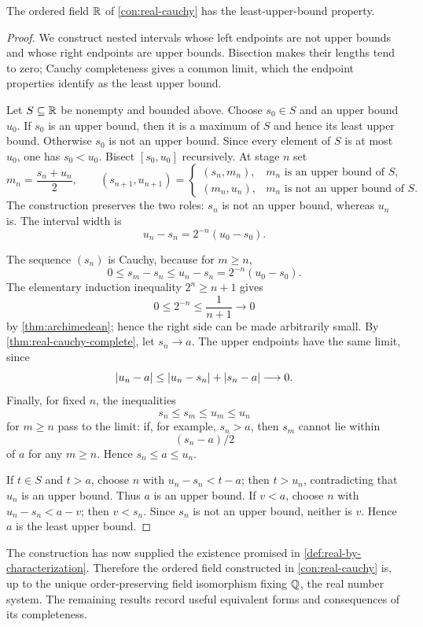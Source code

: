 \begin{theorem}
\label{thm:real-lub}
The ordered field $\mathbb{R}$ of \cref{con:real-cauchy} has the least-upper-bound property.
\end{theorem}

\begin{proof}
We construct nested intervals whose left endpoints are not upper bounds
and whose right endpoints are upper bounds. Bisection makes their lengths
tend to zero; Cauchy completeness gives a common limit, which the endpoint
properties identify as the least upper bound.

Let $S\subseteq\mathbb{R}$ be nonempty and bounded above. Choose $s_0\in S$ and an upper bound $u_0$. If $s_0$ is an upper bound, then it is a maximum of $S$ and hence its least upper bound. Otherwise $s_0$ is not an upper bound. Since every element of $S$ is at most $u_0$, one has $s_0<u_0$. Bisect $[s_0,u_0]$ recursively. At stage $n$ set
\[
m_n=\frac{s_n+u_n}{2},\qquad
(s_{n+1},u_{n+1})=
\begin{cases}
(s_n,m_n),&m_n\text{ is an upper bound of }S,\\
(m_n,u_n),&m_n\text{ is not an upper bound of }S.
\end{cases}
\]
The construction preserves the two roles: $s_n$ is not an upper bound,
whereas $u_n$ is. The interval width is
\[
 u_n-s_n=2^{-n}(u_0-s_0).
\]

The sequence $(s_n)$ is Cauchy, because for $m\geq n$,
\[
0\leq s_m-s_n\leq u_n-s_n=2^{-n}(u_0-s_0).
\]
The elementary induction inequality $2^n\geq n+1$ gives
\[
0\leq 2^{-n}\leq\frac{1}{n+1}\longrightarrow0
\]
by \cref{thm:archimedean}; hence the right side can be made arbitrarily small.
By \cref{thm:real-cauchy-complete}, let $s_n\to a$. The upper endpoints
have the same limit, since
\[
\lvert u_n-a\rvert\leq\lvert u_n-s_n\rvert+\lvert s_n-a\rvert\longrightarrow0.
\]
Finally, for fixed $n$, the inequalities
\[
s_n\leq s_m\leq u_m\leq u_n
\]
 for $m\geq n$ pass to the limit: if, for example, $s_n>a$, then $s_m$ cannot lie within
\[
(s_n-a)/2
\]
 of $a$ for any $m\geq n$. Hence $s_n\leq a\leq u_n$.

If $t\in S$ and $t>a$, choose $n$ with $u_n-s_n<t-a$; then $t>u_n$, contradicting that $u_n$ is an upper bound. Thus $a$ is an upper bound. If $v<a$, choose $n$ with $u_n-s_n<a-v$; then $v<s_n$. Since $s_n$ is not an upper bound, neither is $v$. Hence $a$ is the least upper bound.
\end{proof}

The construction has now supplied the existence promised in \cref{def:real-by-characterization}. Therefore the ordered field constructed in \cref{con:real-cauchy} is, up to the unique order-preserving field isomorphism fixing $\mathbb{Q}$, the real number system. The remaining results record useful equivalent forms and consequences of its completeness.

